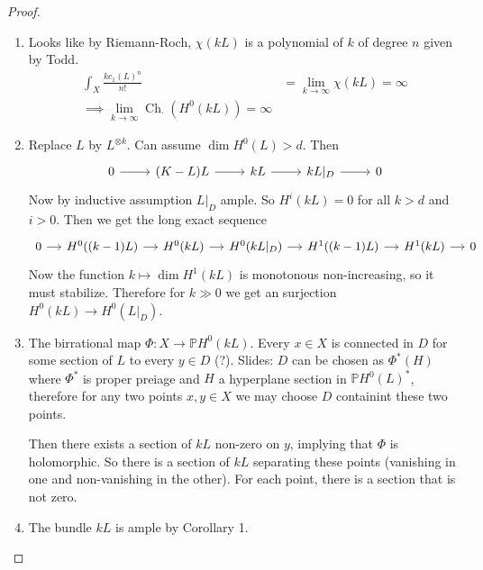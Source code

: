 \begin{proof}
\begin{enumerate}[label=\textbf{Step \arabic*}]
\begin{idea5}{We proved}\leavevmode
	there's only two possible non zero cohomology which is $H^{1}$ and $H^0$.

	That is, there exists $d\gg 0$ such that $H^{i}(L^{\otimes j})=0$ for $i>1$,  $j>d$
\end{idea5}

\item Looks like by Riemann-Roch, $\chi(kL)$ is a polynomial of  $k$ of degree $n$ given by Todd.
	\begin{align*}
	\int_{X}\frac{kc_1(L)^n}{n!}&=\lim_{k \to \infty} \chi(kL)=\infty\\
\implies \lim_{k \to \infty} \operatorname{Ch}_{\cdot}(H^{0}(kL))=\infty
	\end{align*}

\item Replace $L$ by $L^{\otimes k}$. Can assume $\dim H^{0}(L)>d$. Then
	\[\begin{tikzcd}
		0\arrow[r]&(K-L)L\arrow[r]&kL\arrow[r]&kL|_D\arrow[r]&0
	\end{tikzcd}\]
	Now by inductive assumption $L|_{D}$ ample. So $H^{i}(kL)=0$ for all $k>d$ and  $i>0$. Then we get the long exact sequence
	 \[\begin{tikzcd}[column sep=small]
		0\arrow[r]&H^{0}((k-1)L)\arrow[r]&H^{0}(kL)\arrow[r]&H^{0}(kL|_{D})\arrow[r]&H^{1}((k-1)L)\arrow[r]&H^{1}(kL)\arrow[r]&0
	\end{tikzcd}\]
	Now the function $k\mapsto \dim H^{1}(kL)$ is monotonous non-increasing, so it must stabilize. Therefore for $k\gg 0$ we get an surjection $H^{0}(kL)\longrightarrow H^{0}(L|_{D})$.

	\item The birrational map $\Phi:X\longrightarrow \mathbb{P}H^{0}(kL)$. Every $x\in X$ is connected in $D $ for some section of $L$ to every $ y\in D$ (?). {\color{3}Slides:} $D$ can be chosen as $\Phi^*(H)$ where $\Phi^*$ is proper preiage and $H$ a hyperplane section in $\mathbb{P}H^{0}(L)^*$, therefore for any two points $x,y\in X$ we may choose $D$ containint these two points.

		Then there exists a section of  $kL$ non-zero on  $y$, implying that  $\Phi$ is holomorphic. So there is a section of $kL$ separating these points (vanishing in one and non-vanishing in the other). For each point, there is a section that is not zero.

	 \item The bundle $kL$ is ample by Corollary 1.
\end{enumerate}
\end{proof}


